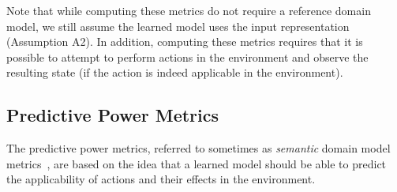 \documentclass{article}
\theoremstyle{definition}
\theoremstyle{remark}
\newif\ifaddcomments
\newcommand{\roni}[1]{\ifaddcomments{\textcolor{red}{[Roni: #1]}}\fi}
\begin{document}
Note that while computing these metrics do not require a reference domain model, we still assume the learned model uses the input representation (Assumption A2).  
In addition, computing these metrics requires that it is possible to attempt to perform actions in the environment and observe the resulting state (if the action is indeed applicable in the environment). 










\subsection{Predictive Power Metrics}
\label{sec:predictiveness-metrics}
The predictive power metrics, referred to sometimes as \emph{semantic} domain model metrics~\citep{aineto2019learning,mordoch2024safe,le2024learning}, are based on the idea that a learned model should be able to predict the applicability of actions and their effects in the environment. 
\end{document}
